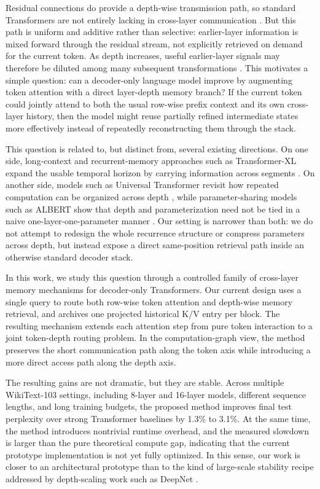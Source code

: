 \documentclass[11pt]{article}
\begin{document}
Residual connections do provide a depth-wise transmission path, so standard Transformers are not entirely lacking in cross-layer communication \cite{he2016deep}. But this path is uniform and additive rather than selective: earlier-layer information is mixed forward through the residual stream, not explicitly retrieved on demand for the current token. As depth increases, useful earlier-layer signals may therefore be diluted among many subsequent transformations \cite{ravula2021realformer,kimi2026attnres,denseformer2024,dca2025,muddformer2025}. This motivates a simple question: can a decoder-only language model improve by augmenting token attention with a direct layer-depth memory branch? If the current token could jointly attend to both the usual row-wise prefix context and its own cross-layer history, then the model might reuse partially refined intermediate states more effectively instead of repeatedly reconstructing them through the stack.

This question is related to, but distinct from, several existing directions. On one side, long-context and recurrent-memory approaches such as Transformer-XL expand the usable temporal horizon by carrying information across segments \cite{dai2019transformerxl}. On another side, models such as Universal Transformer revisit how repeated computation can be organized across depth \cite{dehghani2018universal}, while parameter-sharing models such as ALBERT show that depth and parameterization need not be tied in a naive one-layer-one-parameter manner \cite{lan2019albert}. Our setting is narrower than both: we do not attempt to redesign the whole recurrence structure or compress parameters across depth, but instead expose a direct same-position retrieval path inside an otherwise standard decoder stack.

In this work, we study this question through a controlled family of cross-layer memory mechanisms for decoder-only Transformers. Our current design uses a single query to route both row-wise token attention and depth-wise memory retrieval, and archives one projected historical K/V entry per block. The resulting mechanism extends each attention step from pure token interaction to a joint token-depth routing problem. In the computation-graph view, the method preserves the short communication path along the token axis while introducing a more direct access path along the depth axis.

The resulting gains are not dramatic, but they are stable. Across multiple WikiText-103 settings, including 8-layer and 16-layer models, different sequence lengths, and long training budgets, the proposed method improves final test perplexity over strong Transformer baselines by 1.3\% to 3.1\%. At the same time, the method introduces nontrivial runtime overhead, and the measured slowdown is larger than the pure theoretical compute gap, indicating that the current prototype implementation is not yet fully optimized. In this sense, our work is closer to an architectural prototype than to the kind of large-scale stability recipe addressed by depth-scaling work such as DeepNet \cite{wang2022deepnet}.
\end{document}
